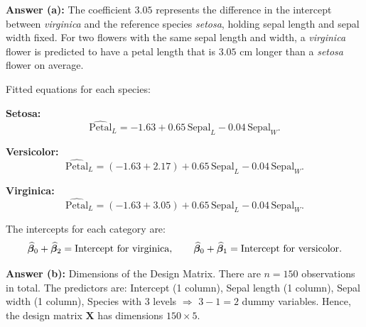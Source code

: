 \textbf{Answer (a):} The coefficient $3.05$ represents the difference in the intercept between \emph{virginica} and the reference species \emph{setosa}, holding sepal length and sepal width fixed. For two flowers with the same sepal length and width, a \emph{virginica} flower is predicted to have a petal length that is $3.05$ cm longer than a \emph{setosa} flower on average.

Fitted equations for each species:

\textbf{Setosa:}
\[
\widehat{\text{Petal}}_L
= -1.63
+ 0.65\,\text{Sepal}_L
- 0.04\,\text{Sepal}_W.
\]

\textbf{Versicolor:}
\[
\widehat{\text{Petal}}_L
= (-1.63 + 2.17)
+ 0.65\,\text{Sepal}_L
- 0.04\,\text{Sepal}_W.
\]

\textbf{Virginica:}
\[
\widehat{\text{Petal}}_L
= (-1.63 + 3.05)
+ 0.65\,\text{Sepal}_L
- 0.04\,\text{Sepal}_W.
\]

\begin{notebox}
The intercepts for each category are:
\[
\widehat{\boldsymbol{\beta}}_0 + \widehat{\boldsymbol{\beta}}_2 = \text{Intercept for virginica},
\qquad
\widehat{\boldsymbol{\beta}}_0 + \widehat{\boldsymbol{\beta}}_1 = \text{Intercept for versicolor}.
\]
\end{notebox}

\textbf{Answer (b):} Dimensions of the Design Matrix. There are $n = 150$ observations in total. The predictors are: Intercept (1 column), Sepal length (1 column), Sepal width (1 column), Species with 3 levels $\Rightarrow$ $3 - 1 = 2$ dummy variables. Hence, the design matrix $\mathbf{X}$ has dimensions $150 \times 5$.

\clearpage
